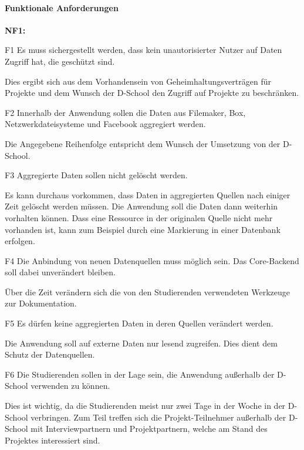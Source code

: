 \paragraph{Funktionale Anforderungen}
\label{sec:functional}
\begin{labeling}{\textbf{NF1:}}
  \item[F1\label{itm:f1}] Es muss sichergestellt werden, dass kein unautorisierter Nutzer auf Daten Zugriff hat, die geschützt sind.

  Dies ergibt sich aus dem Vorhandensein von Geheimhaltungsverträgen für Projekte und dem Wunsch der D-School den Zugriff auf Projekte zu beschränken. 

  \item[F2\label{itm:f2}] Innerhalb der Anwendung sollen die Daten aus Filemaker, Box, Netzwerkdateisysteme und Facebook aggregiert werden.

  Die Angegebene Reihenfolge entspricht dem Wunsch der Umsetzung von der D-School.

  \item[F3\label{itm:f3}] Aggregierte Daten sollen nicht gelöscht werden. 

  Es kann durchaus vorkommen, dass Daten in aggregierten Quellen nach einiger Zeit gelöscht werden müssen. Die Anwendung soll die Daten dann weiterhin vorhalten können. Dass eine Ressource in der originalen Quelle nicht mehr vorhanden ist, kann zum Beispiel durch eine Markierung in einer Datenbank erfolgen.

  \item[F4\label{itm:f4}] Die Anbindung von neuen Datenquellen muss möglich sein. Das Core-Backend soll dabei unverändert bleiben.

  Über die Zeit verändern sich die von den Studierenden verwendeten Werkzeuge zur Dokumentation. 

  \item[F5\label{itm:f5}] Es dürfen keine aggregierten Daten in deren Quellen verändert werden.

  Die Anwendung soll auf externe Daten nur lesend zugreifen. Dies dient dem Schutz der Datenquellen.

  \item[F6\label{itm:f6}] Die Studierenden sollen in der Lage sein, die Anwendung außerhalb der D-School verwenden zu können. 

  Dies ist wichtig, da die Studierenden meist nur zwei Tage in der Woche in der D-School verbringen. Zum Teil treffen sich die Projekt-Teilnehmer außerhalb der D-School mit Interviewpartnern und Projektpartnern, welche am Stand des Projektes interessiert sind. 
\end{labeling}

